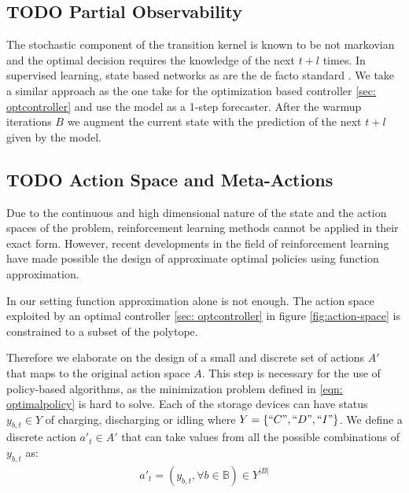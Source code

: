 \documentclass{article}
\begin{document}
	\subsection{\textbf{TODO} Partial Observability}
	    The stochastic component of the transition kernel is known to be not markovian and the optimal decision requires the knowledge of the next $t+l$ times.
	    In supervised learning, state based networks as are the de facto standard \cite{taylor2018forecasting}.
		We take a similar approach as the one take for the optimization based controller \ref{sec: optcontroller} and use the model as a 1-step forecaster. After the warmup iterations $B$ we augment the current state with the prediction of the next $t+l$ given by the model.

	\subsection{\textbf{TODO} Action Space and Meta-Actions}
	Due to the continuous and high dimensional nature of the state and the action spaces of the problem, reinforcement learning methods cannot be applied in their exact form. However, recent developments in the field of reinforcement learning have made possible the design of approximate optimal policies using function approximation.

	In our setting function approximation alone is not enough. The action space exploited by an optimal controller \ref{sec: optcontroller} in figure \ref{fig:action-space} is constrained to a subset of the polytope.
	
	Therefore  we elaborate on the design of a small and discrete set of actions $A'$ that maps to the original action space $A$.  This step is necessary for the use of policy-based algorithms, as the minimization problem defined in \eqref{eqn: optimalpolicy} is hard to solve. Each of the storage devices can have status $y_{b,t}\in Y$ of charging, discharging or idling where $Y= \left\lbrace ``C",``D", ``I" \right\rbrace $. We define a discrete action $a'_{t} \in A'$ that can take values from all the possible combinations of $y_{b,t}$ as:
		\begin{gather}
		a'_{t} = (y_{b,t}, \forall b \in \mathbb{B}) \in Y^{|B|}
		\end{gather}
		
\end{document}
